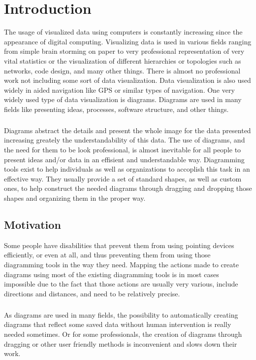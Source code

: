 \chapter{Introduction}
\beginchapter
The usage of visualized data using computers is constantly increasing since the appearance of digital computing. Visualizing data is used in various fields ranging from simple brain storming on paper to very professional representation of very vital statistics or the visualization of different hierarchies or topologies such as networks, code design, and many other things. There is almost no professional work not including some sort of data visualization.
Data visualization is also used widely in aided navigation like GPS or similar types of navigation.
One very widely used type of data visualization is diagrams. Diagrams are used in many fields like presenting ideas, processes, software structure, and other things. 

\paragraph{}
Diagrams abstract the details and present the whole image for the data presented increasing greately the understandability of this data. The use of diagrams, and the need for them to be look professional, is almost inevitable for all people to present ideas and/or data in an effisient and understandable way. Diagramming tools exist to help individuals as well as organizations to accoplish this task in an effective way. They usually provide a set of standard shapes, as well as custom ones, to help construct the needed diagrams through dragging and dropping those shapes and organizing them in the proper way.

\section{Motivation}
Some people have disabilities that prevent them from using pointing devices efficiently, or even at all, and thus preventing them from using those diagramming tools in the way they need. Mapping the actions made to create diagrams using most of the existing diagramming tools is in most cases impossible due to the fact that those actions are usually very various, include directions and distances, and need to be relatively precise.

\paragraph{}
As diagrams are used in many fields, the possibility to automatically creating diagrams that reflect some saved data without human intervention is really needed sometimes. Or for some professionals, the creation of diagrams through dragging or other user friendly methods is inconvenient and slows down their work.

